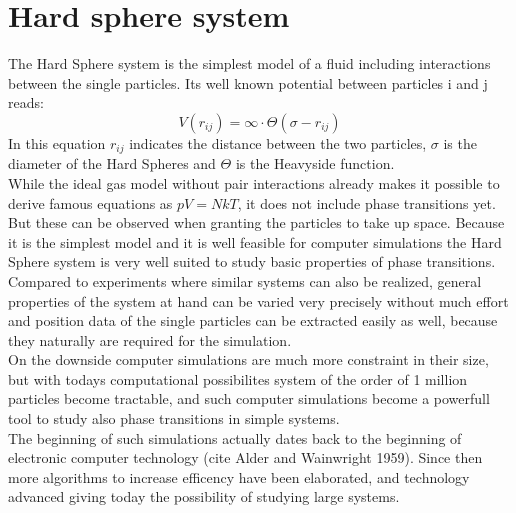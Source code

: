 
\label{chp:theory}

\section{Hard sphere system}
\label{sec:HS_system}

The Hard Sphere system is the simplest model of a fluid including interactions between the single particles. Its well known potential between particles i and j reads:
\begin{equation}
V(r_{ij})=\infty \cdot \Theta(\sigma - r_{ij})
\end{equation}
In this equation $r_{ij}$ indicates the distance between the two particles, $\sigma$ is the diameter of the Hard Spheres and $\Theta$ is the Heavyside function.\\
While the ideal gas model without pair interactions already makes it possible to derive famous equations as $pV=NkT$, it does not include phase transitions yet. But these can be observed when granting the particles to take up space. Because it is the simplest model and it is well feasible for computer simulations the Hard Sphere system is very well suited to study basic properties of phase transitions.\\ 

Compared to experiments where similar systems can also be realized, general properties of the system at hand can be varied very precisely without much effort and position data of the single particles can be extracted easily as well, because they naturally are required for the simulation.\\

On the downside computer simulations are much more constraint in their size, but with todays computational possibilites system of the order of 1 million particles become tractable, and such computer simulations become a powerfull tool to study also phase transitions in simple systems.\\

The beginning of such simulations actually dates back to the beginning of electronic computer technology (cite Alder and Wainwright 1959). Since then more algorithms to increase efficency have been elaborated, and technology advanced giving today the possibility of studying large systems. 

